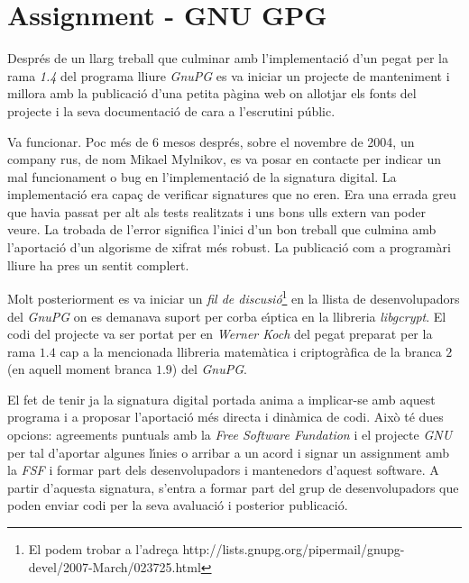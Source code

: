 \documentclass[12pt,twoside,catalan,a4paper]{book}%
\numberwithin{figure}{section}		%
\theoremstyle{definition}   			%
\def\ce{corba e\lgem{}\'{\i}ptica}%
\theoremstyle{saltolinea}   			%
\begin{document}
\section{Assignment - GNU GPG}\label{sec:assigGnu}

Despr\'es de un llarg treball que culminar amb l'implementaci\'o d'un pegat per la rama \emph{1.4} del programa lliure \emph{GnuPG} es va iniciar un projecte de manteniment i millora amb la publicaci\'o d'una petita p\`agina web on allotjar els fonts del projecte i la seva documentaci\'o de cara a l'escrutini p\'ublic.

Va funcionar. Poc m\'es de 6 mesos despr\'es, sobre el novembre de 2004, un company rus, de nom Mikael Mylnikov, es va posar en contacte per indicar un mal funcionament o bug en l'implementaci\'o de la signatura digital. La implementaci\'o era capa\c{c} de verificar signatures que no eren. Era una errada greu que havia passat per alt als tests realitzats i uns bons ulls extern van poder veure. La trobada de l'error significa l'inici d'un bon treball que culmina amb l'aportaci\'o d'un algorisme de xifrat m\'es robust. La publicaci\'o com a program\`ari lliure ha pres un sentit complert.

Molt posteriorment es va iniciar un \emph{fil de discusi\'o}\footnote{El podem trobar a l'adre\c{c}a http://lists.gnupg.org/pipermail/gnupg-devel/2007-March/023725.html} en la llista de desenvolupadors del \emph{GnuPG} on es demanava suport per \ce{} en la llibreria \emph{libgcrypt}. El codi del projecte \cite{BM04} va ser portat per en \emph{Werner Koch} del pegat preparat per la rama $1.4$ cap a la mencionada llibreria matem\`atica i criptogr\`afica de la branca $2$ (en aquell moment branca $1.9$) del \emph{GnuPG}.


El fet de tenir ja la signatura digital portada anima a implicar-se amb aquest programa i a proposar l'aportaci\'o m\'es directa i din\`amica de codi. Aix\`o t\'e dues opcions: agreements puntuals amb la \emph{Free Software Fundation} i el projecte \emph{GNU} per tal d'aportar algunes l\'{\i}nies o arribar a un acord i signar un assignment amb la \emph{FSF} i formar part dels desenvolupadors i mantenedors d'aquest software. A partir d'aquesta signatura, s'entra a formar part del grup de desenvolupadors que poden enviar codi per la seva avaluaci\'o i posterior publicaci\'o.
\end{document}
